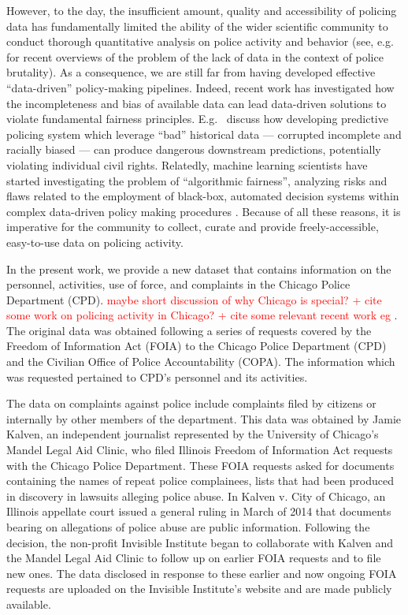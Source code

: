 However, to the day,  the insufficient amount, quality and accessibility of policing data has fundamentally limited the ability of the wider scientific community to conduct thorough quantitative analysis on police activity and behavior (see, e.g.\ \citet{peeples2019data,peeples2020data} for recent overviews of the problem of the lack of data in the context of police brutality). As a consequence, we are still far from having developed effective ``data-driven'' policy-making pipelines. Indeed, recent work has investigated how the incompleteness and bias of available data can lead data-driven solutions to violate fundamental fairness principles. E.g.\ \citet{richardson2019dirty} discuss how developing predictive policing system which leverage ``bad'' historical data --- corrupted incomplete and racially biased --- can produce dangerous downstream predictions, potentially violating individual civil rights. Relatedly, machine learning scientists have started investigating the problem of ``algorithmic fairness'', analyzing  risks and flaws related to the employment of black-box, automated decision systems within complex data-driven policy making procedures \citep{veale2018fairness, sloane2019ai, d2020fairness}. Because of all these reasons, it is imperative for the community to collect, curate and provide freely-accessible, easy-to-use data on policing activity.


In the present work, we provide a new dataset that contains information on the personnel, activities, use of force, and complaints in the Chicago Police Department (CPD). \textcolor{red}{maybe short discussion of why Chicago is special? + cite some work on policing activity in Chicago? + cite some relevant recent work eg \citep{ba2021role}}. 
The original data was obtained following a series of requests covered by the
Freedom of Information Act (FOIA) to the Chicago Police Department (CPD) and
the Civilian Office of Police Accountability (COPA). The information which was
requested pertained to CPD's personnel and its activities.

The data on complaints against police include complaints filed by citizens or internally by other members of the department. This data was obtained by Jamie Kalven, an independent journalist represented by the University of Chicago’s Mandel Legal Aid Clinic, who filed Illinois Freedom of Information Act requests with the Chicago Police Department. These FOIA requests asked for documents containing the names of repeat police complainees, lists that had been produced in discovery in lawsuits alleging police abuse. In Kalven v. City of Chicago, an Illinois appellate court issued a general ruling in March of 2014 that documents bearing on allegations of police abuse are public information. Following the decision, the non-profit Invisible Institute began to collaborate with Kalven and the Mandel Legal Aid Clinic to follow up on earlier FOIA requests and to file new ones. The data disclosed in response to these earlier and now ongoing FOIA requests are uploaded on the Invisible Institute’s website and are made publicly available. 

